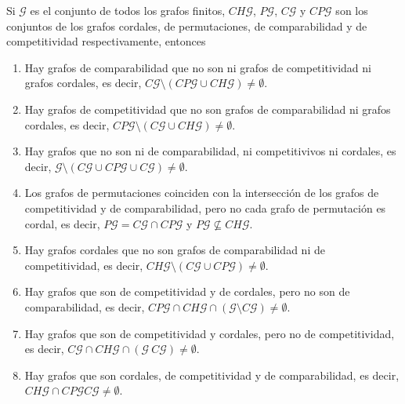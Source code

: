 \begin{teo}
Si $\mathcal{G}$ es el conjunto de todos los grafos finitos, $CH\mathcal{G}$, $P\mathcal{G}$, $C\mathcal{G}$ y $CP\mathcal{G}$ son los conjuntos de los grafos cordales, de permutaciones, de comparabilidad y de competitividad respectivamente, entonces
\begin{enumerate}
\item Hay grafos de comparabilidad que no son ni grafos de competitividad ni grafos cordales, es decir, $C\mathcal{G} \setminus (CP\mathcal{G} \cup CH\mathcal{G}) \neq \emptyset$.

\item Hay grafos de competitividad que no son grafos de comparabilidad ni grafos cordales, es decir, $CP\mathcal{G} \setminus (C\mathcal{G}\cup CH\mathcal{G}) \neq \emptyset$.

\item Hay grafos que no son ni de comparabilidad, ni competitivivos ni cordales, es decir, $\mathcal{G} \setminus (C\mathcal{G} \cup CP\mathcal{G} \cup C\mathcal{G}) \neq \emptyset$.

\item Los grafos de permutaciones coinciden con la intersección de los grafos de competitividad y de comparabilidad, pero no cada grafo de permutación es cordal, es decir, $P\mathcal{G} = C\mathcal{G}\cap CP\mathcal{G}$ y $P\mathcal{G} \not \subseteq CH\mathcal{G}$.

\item Hay grafos cordales que no son grafos de comparabilidad ni de competitividad, es decir, $CH\mathcal{G} \setminus (C\mathcal{G} \cup CP\mathcal{G}) \neq \emptyset$.

\item Hay grafos que son de competitividad y de cordales, pero no son de comparabilidad, es decir, $CP\mathcal{G} \cap CH\mathcal{G} \cap (\mathcal{G} \setminus C\mathcal{G}) \neq \emptyset$.

\item Hay grafos que son de competitividad y cordales, pero no de competitividad, es decir, $C\mathcal{G} \cap CH\mathcal{G} \cap (\mathcal{G} \ C\mathcal{G}) \neq \emptyset$.

\item Hay grafos que son cordales, de competitividad y de comparabilidad, es decir, $CH\mathcal{G} \cap CP\mathcal{G} C\mathcal{G} \neq \emptyset$.
\end{enumerate}
\end{teo}

